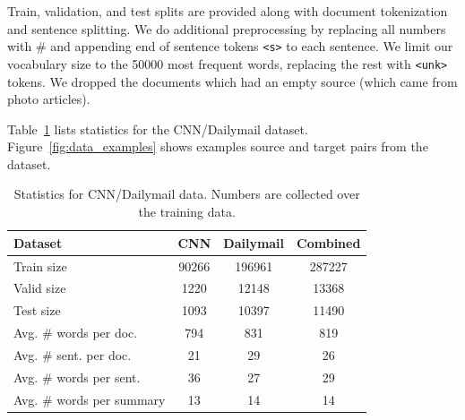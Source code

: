 \documentclass[12pt]{report}
\begin{document}
Train, validation, and test splits are provided along with document tokenization and sentence splitting. We do additional preprocessing by replacing all numbers with \# and appending end of sentence tokens \texttt{<s>} to each sentence. We limit our vocabulary size to the 50000 most frequent words, replacing the rest with \texttt{<unk>} tokens. We dropped the documents which had an empty source (which came from photo articles).

 Table~\ref{table:data_stats} lists statistics for the CNN/Dailymail dataset. Figure~\ref{fig:data_examples} shows examples source and target pairs from the dataset.



\begin{table}[h]
\centering
\begin{tabular}{lccc}
\toprule
Dataset  & CNN & Dailymail & Combined\\
\midrule
Train size & 90266 & 196961 & 287227\\
Valid size & 1220 & 12148 & 13368\\
Test size & 1093 & 10397 & 11490 \\
Avg. \# words per doc. & 794 & 831 & 819\\
Avg. \# sent. per doc. & 21 & 29 & 26\\
Avg. \# words per sent. & 36 & 27 & 29\\
Avg. \# words per summary & 13 & 14 & 14\\
\bottomrule
\end{tabular}
\caption[CNN/Dailymail Statistics]{Statistics for CNN/Dailymail data. Numbers are collected over the training data.}
\label{table:data_stats}
\end{table}
\end{document}
